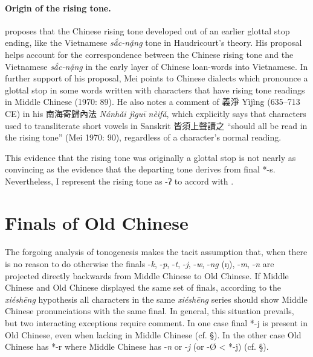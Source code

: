 \paragraph{Origin of the rising
tone.} 
\label{par:origin-of-the-rising-tone}
\citet[]{Mei1970}
proposes that the Chinese rising
tone developed out of an earlier glottal stop ending, like the
Vietnamese \emph{sắc-nặng} tone in Haudricourt's theory. His proposal
helps account for the correspondence between the Chinese rising tone and
the Vietnamese \emph{sắc-nặng} in the early layer of Chinese loan-words
into Vietnamese. In further support of his proposal, Mei points to
Chinese dialects which pronounce a glottal stop in some words written
with characters that have rising tone readings in Middle Chinese (1970:
89). He also notes a comment of 義淨 Yìjìng (635--713 CE) in his
南海寄歸內法 \emph{Nánhǎi jìguī nèifǎ}, which explicitly says that
characters used to transliterate short vowels in Sanskrit 皆須上聲讀之
``should all be read in the rising tone'' (Mei 1970: 90), regardless of
a character's normal reading.

This evidence that the rising tone was originally a glottal stop is not
nearly as convincing as the evidence that the departing tone derives
from final *-s. Nevertheless, I represent the rising tone as -ʔ to
accord with 
\citet[195]{Baxter2014OldChinese}.

\section{Finals of Old Chinese}

\paragraph{}
\label{par:finals-of-old-chinese}
The forgoing analysis of tonogenesis makes the tacit assumption that,
when there is no reason to do otherwise the finals -\emph{k}, -\emph{p},
-\emph{t}, -\emph{j}, -\emph{w}, -\emph{ng} (ŋ), -\emph{m}, -\emph{n}
are projected directly backwards from Middle Chinese to Old Chinese. If
Middle Chinese and Old Chinese displayed the same set of finals,
according to the \emph{xiéshēng} hypothesis all characters in the same
 \emph{xiéshēng} series should show Middle Chinese pronunciations with
the same final. In general, this situation prevails, but two interacting
exceptions require comment. In one case final *-j is present in Old
Chinese, even when lacking in Middle Chinese (cf. §). In the other case
Old Chinese has *-r where Middle Chinese has -\emph{n} or -\emph{j} (or
-Ø \textless{} *-j) (cf. §).

